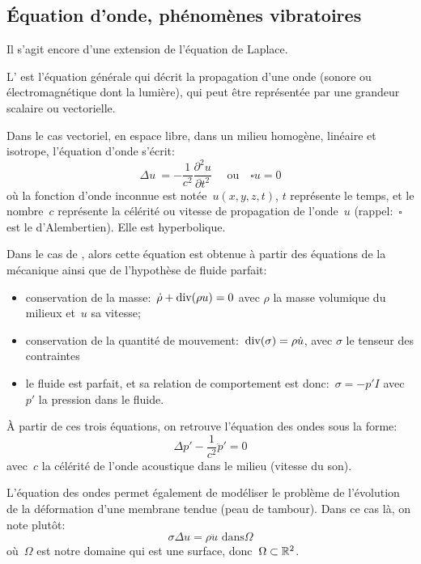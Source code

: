 \medskip
\subsection{Équation d'onde, phénomènes vibratoires}

Il s'agit encore d'une extension de l'équation de Laplace.

L' est l'équation générale qui décrit la propagation d'une onde
(sonore ou électromagnétique dont la lumière),
qui peut être représentée par une grandeur scalaire ou vectorielle.


Dans le cas vectoriel, en espace libre, dans un milieu homogène, linéaire et isotrope, l'équation d'onde s'écrit:
\begin{equation}
  \Delta u \ = - \frac1{c^2} \dfrac{\partial^2 u}{\partial t^2} \quad \text{ ou} \quad \square u =0
\end{equation}
où la fonction d'onde inconnue est notée~$u(x,y,z,t)$, $t$ représente le temps, et 
le nombre~$c$ représente la célérité ou vitesse de propagation de l'onde~$u$ 
(rappel:~$\square$ est le d'Alembertien). Elle est hyperbolique.

\medskip
Dans le cas de , alors cette équation est obtenue à partir des 
équations de la mécanique ainsi que de l'hypothèse de fluide parfait:
\begin{itemize}
  \item conservation de la masse:~$\dot{\rho}+\operatorname{div}(\rho u)=0$ avec
	$\rho$ la masse volumique du milieux et~$u$ sa vitesse;
  \item conservation de la quantité de mouvement:~$\operatorname{div}(\sigma)=\rho\dot{u}$, avec
	$\sigma$ le tenseur des contraintes
  \item le fluide est parfait, et sa relation de comportement est donc:~$\sigma=-p'I$ avec
	$p'$ la pression dans le fluide.
\end{itemize}

À partir de ces trois équations, on retrouve l'équation des ondes sous la forme:
\begin{equation}
\Delta p' - \dfrac1{c^2} \ddot{p}' = 0
\end{equation}
avec~$c$ la célérité de l'onde acoustique dans le milieu (vitesse du son).

\medskip
L'équation des ondes permet également de modéliser le problème de l'évolution 
de la déformation d'une membrane tendue (peau de tambour).
Dans ce cas là, on note plutôt:
\begin{equation}
 \sigma \Delta u = \rho\ddot{u} \text{ dans}\Omega
\end{equation}
où~$\Omega$ est notre domaine qui est une surface, donc~$\Omega\subset\mathbb R^2$.

